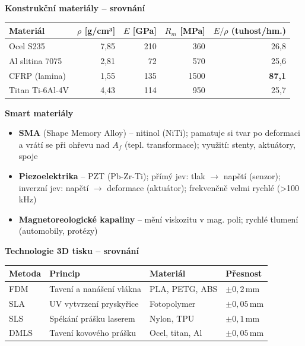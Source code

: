 \documentclass[a4paper,10pt]{article}
\begin{document}
\begin{vysvetlenibox}
\textbf{Konstrukční materiály -- srovnání}

\begin{center}
\begin{tabular}{@{} l r r r r @{}}
    \toprule
    \textbf{Materiál} & $\rho$ [g/cm³] & $E$ [GPa]
                      & $R_m$ [MPa] & $E/\rho$ (tuhost/hm.) \\
    \midrule
    Ocel S235       & 7,85 & 210 & 360 & 26,8 \\
    Al slitina 7075 & 2,81 & 72  & 570 & 25,6 \\
    CFRP (lamina)   & 1,55 & 135 & 1500 & \textbf{87,1} \\
    Titan Ti-6Al-4V & 4,43 & 114 & 950 & 25,7 \\
    \bottomrule
\end{tabular}
\end{center}

\textbf{Smart materiály}
\begin{itemize}[noitemsep, leftmargin=1.4em, topsep=4pt]
    \item \textbf{SMA} (Shape Memory Alloy) -- nitinol (NiTi); pamatuje si tvar
          po deformaci a vrátí se při ohřevu nad $A_f$ (tepl. transformace);
          využití: stenty, aktuátory, spoje
    \item \textbf{Piezoelektrika} -- PZT (Pb-Zr-Ti); přímý jev:
          tlak $\to$ napětí (senzor); inverzní jev: napětí $\to$ deformace
          (aktuátor); frekvenčně velmi rychlé (\textgreater100\,kHz)
    \item \textbf{Magnetoreologické kapaliny} -- mění viskozitu v mag. poli;
          rychlé tlumení (automobily, protézy)
\end{itemize}

\textbf{Technologie 3D tisku -- srovnání}

\begin{center}
\begin{tabularx}{0.95\linewidth}{@{} l X l l @{}}
    \toprule
    \textbf{Metoda} & \textbf{Princip} & \textbf{Materiál}
                    & \textbf{Přesnost} \\
    \midrule
    FDM  & Tavení a nanášení vlákna & PLA, PETG, ABS & $\pm0{,}2$\,mm \\
    SLA  & UV vytvrzení pryskyřice & Fotopolymer     & $\pm0{,}05$\,mm \\
    SLS  & Spékání prášku laserem  & Nylon, TPU      & $\pm0{,}1$\,mm \\
    DMLS & Tavení kovového prášku  & Ocel, titan, Al & $\pm0{,}05$\,mm \\
    \bottomrule
\end{tabularx}
\end{center}
\end{vysvetlenibox}


\end{document}
